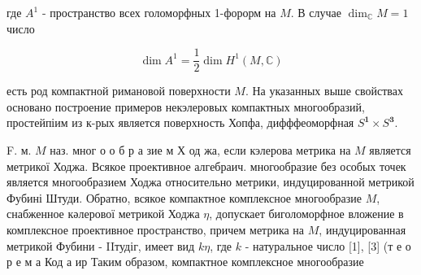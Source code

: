 \documentclass[10pt]{article}
\begin{document}
где $A^{1}$ - пространство всех голоморфных 1-форорм на $M$. В случае $\operatorname{dim}_{\mathbb{C}} M=1$ число



\[

\operatorname{dim} A^{1}=\frac{1}{2} \operatorname{dim} H^{1}(M, \mathbb{C})

\]



есть род компактной римановой поверхности $M$. На указанных выше свойствах основано построение примеров некэлеровых компактных многообразий, простейпіим из к-рых является поверхность Хопфа, дифффеоморфная $S^{\mathbf{1}} \times S^{\mathbf{3}}$.



F. м. $M$ наз. мног о о б р а зие м Х од жа, если кэлерова метрика на $M$ является метрикої Ходжа. Всякое проективное алгебраич. многообразие без особых точек является многообразием Ходжа относительно метрики, индуцированной метрикой Фубині Штуди. Обратно, всякое компактное комплексное многообразие $M$, снабженное кәлерової метрикой Ходжа $\eta$, допускает биголоморфное вложение в комплексное проективное пространство, причем метрика на $M$, индуцированная метрикой Фубини - IIтудіг, имеет вид $k \eta$, где $k$ - натуральное число [1], [3] (т е о р е м а Код а ир Таким образом, компактное комплексное многообразие
\end{document}

